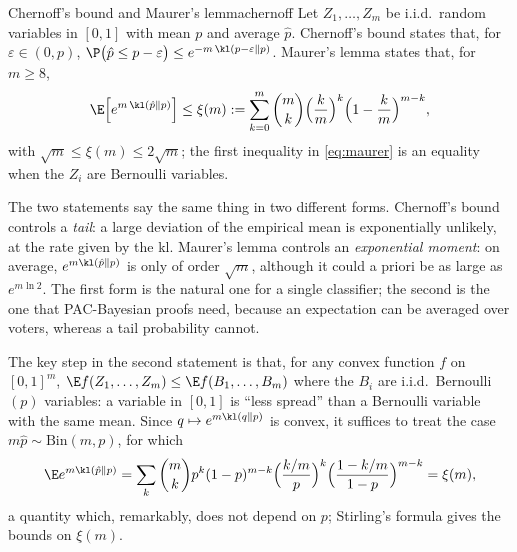 \begin{lemma}{Chernoff's bound and Maurer's lemma}{chernoff}
Let $Z_1,\dots,Z_m$ be i.i.d.\ random variables in $[0,1]$ with mean $p$ and
average $\hat p$. Chernoff's bound states that, for $\varepsilon\in(0,p)$,
$\P\big(\hat p\leq p-\varepsilon\big)\leq e^{-m\,\kl(p-\varepsilon\|p)}$.
Maurer's lemma \citep{maurer2004note} states that, for $m\geq 8$,
\begin{equation}\label{eq:maurer}
  \E\Big[e^{m\,\kl(\hat p\|p)}\Big]\leq \xi(m):=\sum_{k=0}^m\binom mk\Big(\frac km\Big)^k\Big(1-\frac km\Big)^{m-k},
\end{equation}
with $\sqrt m\leq\xi(m)\leq 2\sqrt m$; the first inequality in \eqref{eq:maurer} is an
equality when the $Z_i$ are Bernoulli variables.
\end{lemma}

The two statements say the same thing in two different forms. Chernoff's bound
controls a \emph{tail}: a large deviation of the empirical mean is exponentially
unlikely, at the rate given by the kl. Maurer's lemma controls an
\emph{exponential moment}: on average, $e^{m\kl(\hat p\|p)}$ is only of order
$\sqrt m$, although it could a priori be as large as $e^{m\ln 2}$. The first form
is the natural one for a single classifier; the second is the one that
PAC-Bayesian proofs need, because an expectation can be averaged over voters,
whereas a tail probability cannot.

\begin{proofsketch}
The key step in the second statement is that, for any convex function $f$ on
$[0,1]^m$, $\E f(Z_1,\dots,Z_m)\leq \E f(B_1,\dots,B_m)$ where the $B_i$ are
i.i.d.\ Bernoulli$(p)$ variables: a variable in $[0,1]$ is ``less spread'' than
a Bernoulli variable with the same mean. Since $q\mapsto e^{m\kl(q\|p)}$ is
convex, it suffices to treat the case $m\hat p\sim\mathrm{Bin}(m,p)$, for which
\[
\E e^{m\kl(\hat p\|p)}=\sum_k \binom mk p^k(1-p)^{m-k}\Big(\frac{k/m}{p}\Big)^{k}\Big(\frac{1-k/m}{1-p}\Big)^{m-k}=\xi(m),
\]
a quantity which, remarkably, does not depend on $p$; Stirling's formula gives
the bounds on $\xi(m)$.
\end{proofsketch}


